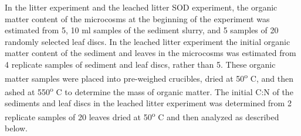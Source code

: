 In the litter experiment and the leached litter SOD experiment, the organic matter content of the microcosms at the beginning of the experiment was estimated from 5, 10 ml samples of the sediment slurry, and 5 samples of 20 randomly selected leaf discs. In the leached litter experiment the initial organic matter content of the sediment and leaves in the microcosms was estimated from 4 replicate samples of sediment and leaf discs, rather than 5. These organic matter samples were placed into pre-weighed crucibles, dried at 50\textsuperscript{o} C, and then ashed at 550\textsuperscript{o} C to determine the mass of organic matter. The initial C:N of the sediments and leaf discs in the leached litter experiment was determined from 2 replicate samples of 20 leaves dried at 50\textsuperscript{o} C and then analyzed as described below.